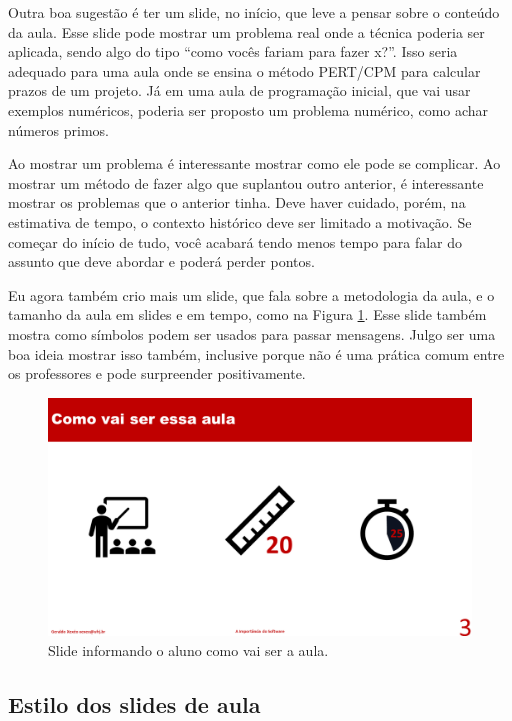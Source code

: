 Outra boa sugestão é ter um slide, no início, que leve a pensar sobre o conteúdo da aula. Esse slide pode mostrar um problema real onde a técnica poderia ser aplicada, sendo algo do tipo ``como vocês fariam para fazer x?''. Isso seria adequado para uma aula onde se ensina o método PERT/CPM para calcular prazos de um projeto. Já em uma aula de programação inicial, que vai usar exemplos numéricos, poderia ser proposto um problema numérico, como achar números primos.

Ao mostrar um problema é interessante mostrar como ele pode se complicar. Ao mostrar um método de fazer algo que suplantou outro anterior, é interessante mostrar os problemas que o anterior tinha. Deve haver cuidado, porém, na estimativa de tempo, o contexto histórico deve ser limitado a motivação. Se começar do início de tudo, você acabará tendo menos tempo para falar do assunto que deve abordar e poderá perder pontos.

Eu agora também crio mais um slide, que fala sobre a metodologia da aula, e o tamanho da aula em slides e em tempo, como na Figura \ref{fig:metodologia}. Esse slide também mostra como símbolos podem ser usados para passar mensagens. Julgo ser  uma boa ideia mostrar isso também, inclusive porque não é uma prática comum entre os professores e pode surpreender positivamente.

\begin{figure}[htb]
    \centering
    \includegraphics[width=\tam\linewidth,frame]{imagens/metodologia.png}
    \caption{Slide informando o aluno como vai ser a aula.}
    \label{fig:metodologia}
\end{figure}




\subsection{Estilo dos slides de aula}

